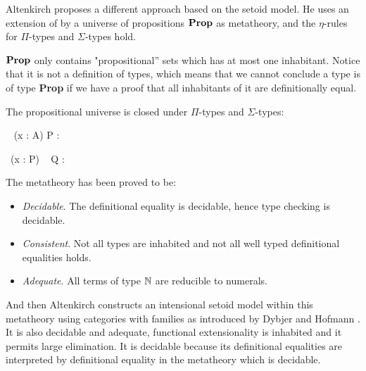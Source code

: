 Altenkirch \cite{alti:lics99}  proposes a different approach based on the setoid model.
He uses an extension of \itt by a universe of propositions $\operatorname{\mathbf{Prop}}$ as metatheory, and the $\eta$-rules for $\Pi$-types and $\Sigma$-types hold. 








 $\operatorname{\mathbf{Prop}}$ only contains "propositional'' sets which has at most one
inhabitant. Notice that it is not a definition of types, which means
that we cannot conclude a type is of type \textbf{Prop} if we have a
proof that all inhabitants of it are definitionally equal.

The propositional universe is closed under $\Pi$-types and $\Sigma$-types:



{\Gamma \vdash \Pi~ (x : A) \to P : \Prop}



{\Gamma \vdash \Sigma ~(x : P) ~ Q : \Prop}


The metatheory has been proved {\cite{alti:lics99}} to be:

\begin{itemize}
\item \emph{Decidable}. The definitional equality is decidable, hence type checking is decidable.

\item \emph{Consistent}. Not all types are inhabited and not all well typed definitional equalities holds. 

\item \emph{Adequate}. All terms of type $\mathbb{N}$ are reducible to numerals.
\end{itemize}

And then Altenkirch constructs an intensional setoid model within this metatheory using categories with families as introduced by Dybjer \cite{Dyb:96} and Hofmann
\cite{hof:97}.  It is also decidable and adequate, functional extensionality is inhabited and it permits large elimination. It is decidable because its definitional equalities are interpreted by definitional equality in the metatheory which is decidable.

